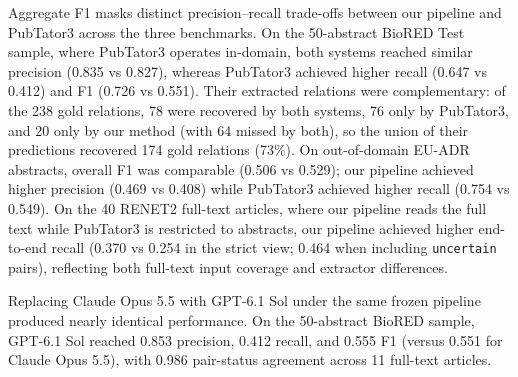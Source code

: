 \documentclass[preprint,10pt,letterpaper]{elsarticle}
\newcommand{\st}[1]{\texttt{#1}}             %
\begin{document}
Aggregate F1 masks distinct precision--recall trade-offs between our pipeline and PubTator3 across the three benchmarks. On the 50-abstract BioRED Test sample, where PubTator3 operates in-domain, both systems reached similar precision (0.835 vs 0.827), whereas PubTator3 achieved higher recall (0.647 vs 0.412) and F1 (0.726 vs 0.551). Their extracted relations were complementary: of the 238 gold relations, 78 were recovered by both systems, 76 only by PubTator3, and 20 only by our method (with 64 missed by both), so the union of their predictions recovered 174 gold relations (73\%). On out-of-domain EU-ADR abstracts, overall F1 was comparable (0.506 vs 0.529); our pipeline achieved higher precision (0.469 vs 0.408) while PubTator3 achieved higher recall (0.754 vs 0.549). On the 40 RENET2 full-text articles, where our pipeline reads the full text while PubTator3 is restricted to abstracts, our pipeline achieved higher end-to-end recall (0.370 vs 0.254 in the strict view; 0.464 when including \st{uncertain} pairs), reflecting both full-text input coverage and extractor differences.

Replacing Claude Opus 5.5 with GPT-6.1 Sol under the same frozen pipeline produced nearly identical performance. On the 50-abstract BioRED sample, GPT-6.1 Sol reached 0.853 precision, 0.412 recall, and 0.555 F1 (versus 0.551 for Claude Opus 5.5), with 0.986 pair-status agreement across 11 full-text articles.
\end{document}

